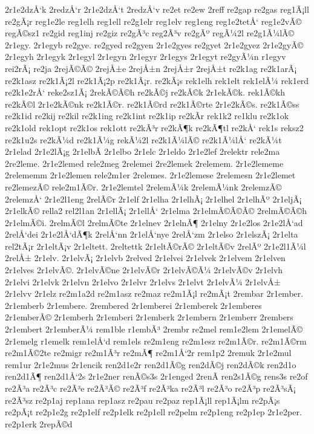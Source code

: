 {2r1e2dzÅ‘k
2redzÅ‘r
2r1e2dzÅ‘t
2redzÅ‘v
re2et
re2ew
2reff
re2gap
re2gas
reg1Ã¡ll
re2gÃ¡r
reg1e2le
reg1elh
reg1ell
re2g1elr
reg1elv
reg1eng
reg1e2tetÅ‘
reg1e2vÃ©
regÃ©sz1
re2gid
reg1inj
re2giz
re2gÃ³c
reg2Ã³v
re2gÃº
regÃ¼2l
re2g1Ã¼lÃ©
2r1egy.
2r1egyb
re2gye.
re2gyed
re2gyen
2r1e2gyes
re2gyet
2r1e2gyez
2r1e2gyÃ©
2r1egyh
2r1egyk
2r1egyl
2r1egyn
2r1egyr
2r1egys
2r1egyt
re2gyÃ¼n
r1egyv
rei2rÃ¡
re2ja
2rejÃ©Ã©
2rejÅ±e
2rejÅ±n
2rejÅ±r
2rejÅ±t
re2k1ag
re2k1arÃ¡
re2k1asz
re2k1Ã¡2l
re2k1Ã¡2p
re2k1Ã¡r.
re2kÃ¡s
rek1elh
rek1elt
rek1elÃ¼
rek1erd
re2k1e2rÅ‘
reke2sz1Ã¡
2rekÃ©Ã©h
re2kÃ©j
re2kÃ©k
2r1ekÃ©k.
rek1Ã©kh
re2kÃ©l
2r1e2kÃ©nk
re2k1Ã©r.
re2k1Ã©rd
re2k1Ã©rte
2r1e2kÃ©s.
re2k1Ã©ss
re2k1id
re2kij
re2kil
re2k1ing
re2k1int
re2k1ip
re2kÃ­r
rek1k2
re1klu
re2k1ok
re2k1old
rek1opt
re2k1os
rek1ott
re2kÃ³r
re2kÃ¶k
re2kÃ¶tl
re2kÅ‘
rek1s
reksz2
re2k1u2s
re2kÃ¼d
re2k1Ã¼g
rekÃ¼2l
re2k1Ã¼lÃ©
re2k1Ã¼lÅ‘
re2kÃ¼t
2r1elad
2r1e2lÃ¡g
2r1elbÃ­
2r1elbo
2r1elc
2r1eldo
2r1e2lef
2relektr
rele2ma
2re2leme.
2r1e2lemed
rele2meg
2relemei
2re2lemek
2relemem.
2r1e2lememe
2relememm
2r1e2lemen
rele2m1er
2relemes.
2r1e2lemese
2relemesn
2r1e2lemet
re2lemezÃ©
rele2m1Ã©r.
2r1e2lemtel
2relemÃ¼k
2relemÃ¼nk
2relemzÃ©
2relemzÅ‘
2r1e2l1eng
2relÃ©r
2r1elf
2r1elha
2r1elhÃ¡
2r1elhel
2r1elhÃº
2r1eljÃ¡
2r1elkÃ©
rella2
rel2l1an
2r1ellÃ¡
2r1ellÅ‘
2r1elma
2r1elmÃ©Ã©Ã©
2relmÃ©Ã©h
2r1elmÃ©i.
2relmÃ©l
2relmÃ©te
2r1elnev
2r1elnÃ¶
2r1elny
2r1e2los
2r1e2lÅ‘ad
2relÅ‘dei
2r1e2lÅ‘dÃ¶k
2relÅ‘nn
2r1elÅ‘nye
2relÅ‘zm
2r1elso
2r1elszÃ¡
2r1elta
rel2tÃ¡r
2r1eltÃ¡v
2r1eltett.
2reltettk
2r1eltÃ©rÃ©
2r1eltÃ©v
2relÃº
2r1e2l1Ã¼l
2relÅ±
2r1elv.
2r1elvÃ¡
2r1elvb
2relved
2r1elvei
2r1elvek
2r1elvem
2r1elven
2r1elves
2r1elvÃ©.
2r1elvÃ©ne
2r1elvÃ©r
2r1elvÃ©Ã¼
2r1elvÃ©v
2r1elvh
2r1elvi
2r1elvk
2r1elvn
2r1elvo
2r1elvr
2r1elvs
2r1elvt
2r1elvÃ¼
2r1elvÅ±
2r1elvv
2r1elz
re2m1a2d
re2m1asz
re2maz
re2m1Ã¡l
re2mÃ¡t
2rembar
2r1ember.
2r1emberb
2r1embere.
2rembered
2r1emberei
2r1emberek
2r1emberes
2r1emberÃ©
2r1emberh
2r1emberi
2r1emberk
2r1embern
2r1emberr
2rembers
2r1embert
2r1emberÃ¼
rem1ble
r1embÃ³
2rembr
re2mel
rem1e2lem
2r1emelÃ©
2r1emelg
r1emelk
rem1elÅ‘d
rem1els
re2m1eng
re2m1esz
re2m1Ã©r.
re2m1Ã©rm
re2m1Ã©2te
re2migr
re2m1Ã³r
re2mÃ¶
re2m1Å‘2r
rem1p2
2remuk
2r1e2mul
rem1ur
2r1e2mus
2r1encik
ren2d1e2r
ren2d1Ã©g
ren2dÃ©j
ren2dÃ©k
ren2d1o
ren2d1Ã¶
ren2d1Å‘2s
2r1e2ner
renÃ©s3s
2r1enged
2renÃ­
ren2s1Ã©g
rens3s
re2of
re2Ã³a
re2Ã³c
re2Ã³e
re2Ã³Ã©
re2Ã³f
re2Ã³ka
re2Ã³l
re2Ã³o
re2Ã³p
re2Ã³sÃ¡
re2Ã³sz
re2p1aj
rep1ana
rep1asz
re2pau
re2paz
rep1Ã¡ll
rep1Ã¡lm
re2pÃ¡s
re2pÃ¡t
re2p1e2g
re2p1elf
re2p1elk
re2p1ell
re2pelm
re2p1eng
re2p1ep
2r1e2per.
re2p1erk
2repÃ©d
}
